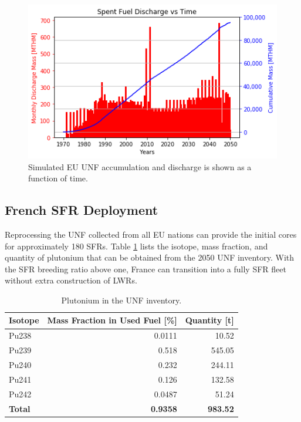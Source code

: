 \begin{figure}[htbp!]
	\begin{center}
			\includegraphics[scale=0.7]{./images/eu_future/snf_discharge.png}
	\end{center}
        \caption{Simulated \gls{EU} \gls{UNF} accumulation and discharge is 
shown as a function of time.}
	\label{fig:eu_snf}
\end{figure}


\subsection{French \gls{SFR} Deployment}
\FloatBarrier

Reprocessing the \gls{UNF} collected from all EU nations can provide the 
initial cores for approximately 180 \glspl{SFR}. Table \ref{tab:pu} lists the 
isotope, mass fraction, and quantity of plutonium that can be obtained from the 
2050 \gls{UNF} inventory.  With the \gls{SFR} breeding ratio above one, France 
can transition into a fully \gls{SFR} fleet without extra construction of 
\glspl{LWR}. 

\begin{table}[h]
	\centering
	\caption{Plutonium in the \gls{UNF} inventory.}
	\begin{tabular}{lrr}
		\hline
		\textbf{Isotope} & \textbf{Mass Fraction in Used Fuel [\%]} & \textbf{Quantity [t]} \\ \hline
		Pu238 & 0.0111 & 10.52 \\ 
		Pu239 & 0.518 & 545.05 \\ 
		Pu240 & 0.232 & 244.11 \\ 
		Pu241 & 0.126 & 132.58 \\ 
		Pu242 & 0.0487 & 51.24 \\ \hline
		\textbf{Total} & \textbf{0.9358} & \textbf{983.52} \\ \hline
	\end{tabular}
	
	\label{tab:pu}
\end{table}

